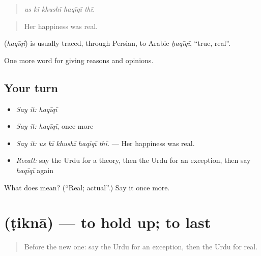 \begin{quote}
    
\end{quote}

\begin{quote}
\emph{us kī khushī haqīqī thī.}
\end{quote}

\begin{quote}
Her happiness was real.
\end{quote}

\begin{cousinweb}
\textbf{} (\emph{haqīqī}) is usually traced, through Persian, to Arabic \emph{ḥaqīqī}, \textquotedblleft{}true, real\textquotedblright{}.
\end{cousinweb}

\begin{grammarlens}[title={What you've built}]
One more word for giving reasons and opinions.
\end{grammarlens}

\subsection*{Your turn}
\begin{itemize}
\raggedright
  \item \emph{Say it:} \emph{haqīqī}
  \item \emph{Say it:} \emph{haqīqī}, once more
  \item \emph{Say it:} \emph{us kī khushī haqīqī thī.} — Her happiness was real.
  \item \emph{Recall:} say the Urdu for a theory, then the Urdu for an exception, then say \emph{haqīqī} again
\end{itemize}

\begin{tcolorbox}[breakable,colback=teal!4,colframe=teal!35!black,title={Before you move on}]
What does  mean? (\textquotedblleft{}Real; actual\textquotedblright{}.) Say it once more.
\end{tcolorbox}
\section[\texorpdfstring{\ur{ٹکنا} (ṭiknā)}{ٹکنا (ṭiknā)}]{ (ṭiknā) — to hold up; to last}

\label{lesson:UR-C353-tikna}



\begin{quote}
Before the new one: say the Urdu for an exception, then the Urdu for real.
\end{quote}

